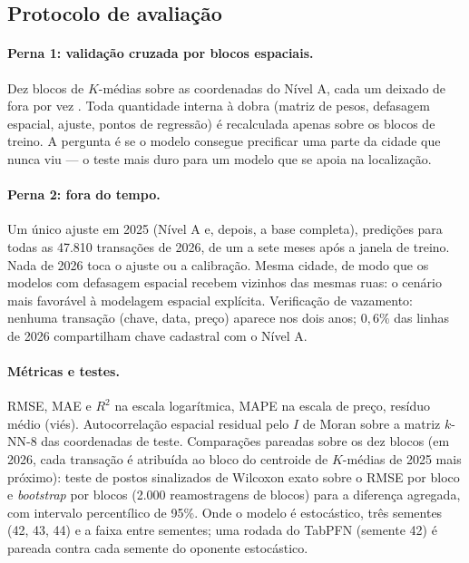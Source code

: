 \documentclass[11pt,a4paper]{article}
\begin{document}
\subsection{Protocolo de avaliação}

\paragraph{Perna 1: validação cruzada por blocos espaciais.} Dez blocos de $K$-médias sobre as
coordenadas do Nível A, cada um deixado de fora por vez \citep{roberts2017,meyer2022}. Toda
quantidade interna à dobra (matriz de pesos, defasagem espacial, ajuste, pontos de regressão) é
recalculada apenas sobre os blocos de treino. A pergunta é se o modelo consegue precificar uma
parte da cidade que nunca viu --- o teste mais duro para um modelo que se apoia na localização.

\paragraph{Perna 2: fora do tempo.} Um único ajuste em 2025 (Nível A e, depois, a base
completa), predições para todas as 47.810 transações de 2026, de um a sete meses após a janela
de treino. Nada de 2026 toca o ajuste ou a calibração. Mesma cidade, de modo que os modelos com
defasagem espacial recebem vizinhos das mesmas ruas: o cenário mais favorável à modelagem
espacial explícita. Verificação de vazamento: nenhuma transação (chave, data, preço) aparece
nos dois anos; $0{,}6\%$ das linhas de 2026 compartilham chave cadastral com o Nível A.

\paragraph{Métricas e testes.} RMSE, MAE e $R^2$ na escala logarítmica, MAPE na escala de
preço, resíduo médio (viés). Autocorrelação espacial residual pelo $I$ de Moran
\citep{moran1950} sobre a matriz $k$-NN-8 das coordenadas de teste. Comparações pareadas sobre os dez blocos (em 2026,
cada transação é atribuída ao bloco do centroide de $K$-médias de 2025 mais próximo): teste de
postos sinalizados de Wilcoxon exato sobre o RMSE por bloco e
\emph{bootstrap} por blocos (2.000 reamostragens de blocos) para a diferença agregada, com
intervalo percentílico de 95\%. Onde o modelo é estocástico, três sementes (42, 43, 44) e a
faixa entre sementes; uma rodada do TabPFN (semente 42) é pareada contra cada semente do
oponente estocástico.
\end{document}
